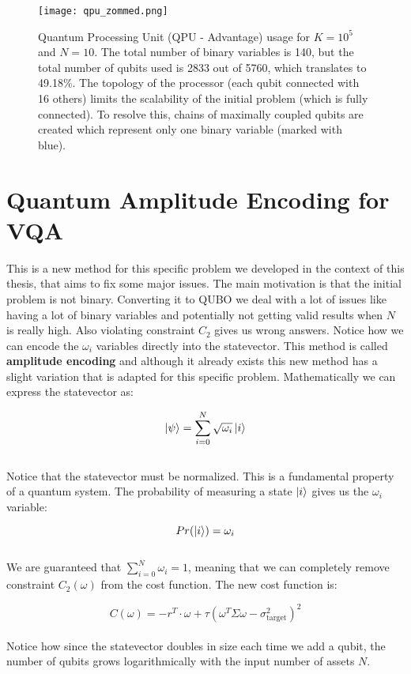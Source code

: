 \documentclass[12pt,a4paper]{report}
\begin{document}
\begin{figure}[!h]
    \centering
    \texttt{[image: qpu\_zommed.png]} 
    \caption{Quantum Processing Unit (QPU - Advantage) usage for \(K=10^5\) and \(N=10\). The total number of binary variables is 140, but the total number of qubits used is 2833 out of 5760, which translates to 49.18\%. The topology of the processor (each qubit connected with 16 others) limits the scalability of the initial problem (which is fully connected). To resolve this, chains of maximally coupled qubits are created which represent only one binary variable (marked with blue).}
    \label{fig:qpu}
\end{figure}



\newpage

\section{Quantum Amplitude Encoding for VQA}

This is a new method for this specific problem we developed in the context of this thesis, that aims to fix some major issues. The main motivation is that the initial problem is not binary. Converting it to QUBO we deal with a lot of issues like having a lot of binary variables and potentially not getting valid results when \(N\) is really high. Also violating constraint \(C_2\) gives us wrong answers. Notice how we can encode the \(\omega_i\) variables directly into the statevector. This method is called \textbf{amplitude encoding} and although it already exists this new method has a slight variation that is adapted for this specific problem. Mathematically we can express the statevector as:

\[
\ket{\psi} = \sum_{i=0}^{N} \sqrt{\omega_i} \ket{i}
\]
\\
\noindent
Notice that the statevector must be normalized. This is a fundamental property of a quantum system. The probability of measuring a state \(\ket{i}\) gives us the \(\omega_i\) variable:

\[
Pr(\ket{i}) = \omega_i
\]
\\
\noindent
We are guaranteed that \(\sum_{i=0}^{N} \omega_i = 1\), meaning that we can completely remove constraint \(C_2(\omega)\) from the cost function. The new cost function is:

\[
C(\omega) = -r^T \cdot \omega + \tau \left( \omega^T \Sigma \omega - \sigma_{\text{target}}^2 \right)^2
\]
\\
\noindent
Notice how since the statevector doubles in size each time we add a qubit, the number of qubits grows logarithmically with the input number of assets \(N\).
\end{document}
